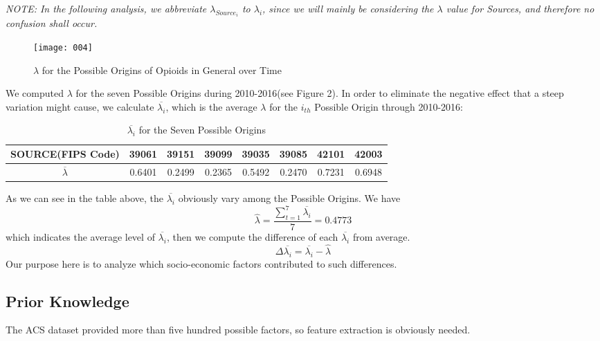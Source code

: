 \textit{
NOTE: In the following analysis, we abbreviate $\lambda_{Source_i}$ to $\lambda_i$, since we will mainly be considering the $\lambda$ value for Sources, and therefore no confusion shall occur. 
}

\begin{figure}[H]
	\centering
	\texttt{[image: 004]}
	\caption{$\lambda$ for the Possible Origins of Opioids in General over Time}
\end{figure}

We computed $\lambda$ for the seven Possible Origins during 2010-2016(see Figure 2). In order to eliminate the negative effect that a steep variation might cause, we calculate $\overline{\lambda_i}$, which is the average $\lambda$ for the $i_{th}$ Possible Origin through 2010-2016:

\begin{table}[H]
	\centering
\begin{tabular}{|c|c|c|c|c|c|c|c|}
	\hline
	\rowcolor[HTML]{656565} 
	{\color[HTML]{FFFFFF} \textbf{SOURCE(FIPS Code)}} &{\color[HTML]{FFFFFF} \textbf{39061}} & {\color[HTML]{FFFFFF} \textbf{39151}} & {\color[HTML]{FFFFFF} \textbf{39099}}  & {\color[HTML]{FFFFFF} \textbf{39035}} & {\color[HTML]{FFFFFF} \textbf{39085}} & {\color[HTML]{FFFFFF} \textbf{42101}}  & {\color[HTML]{FFFFFF} \textbf{42003}}\\ \hline
	$\overline{\lambda}$ & 0.6401 & 0.2499 & 0.2365 & 0.5492 & 0.2470 & 0.7231 & 0.6948 \\ \hline
\end{tabular}
\centering
\caption{$\overline{\lambda_i}$ for the Seven Possible Origins}
\end{table}

As we can see in the table above, the $\overline{\lambda_i}$ obviously vary among the Possible Origins. We have
\begin{equation}
\hat{\lambda}=\frac{\sum_{t=1}^{7}\overline{\lambda_i}}{7}=0.4773
\end{equation}
which indicates the average level of $\overline{\lambda_i}$, then we compute the difference of each $\overline{\lambda_i}$ from average.
\begin{equation}
\Delta \overline{\lambda_i} = \overline{\lambda_i} - \hat{\lambda}
\end{equation}
Our purpose here is to analyze which socio-economic factors contributed to such differences.

\subsection{Prior Knowledge}
The ACS dataset provided more than five hundred possible factors, so feature extraction is obviously needed. 

